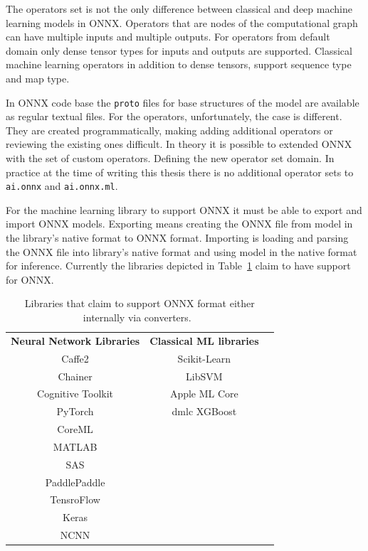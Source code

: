 \documentclass[english, 12pt, a4paper, elec, utf8, online]{aaltothesis}
\begin{document}
The operators set is not the only difference between classical and deep machine learning models in ONNX.  Operators that are nodes of the computational graph can have multiple inputs and multiple outputs. For operators from default domain only dense tensor types for inputs and outputs are supported. Classical machine learning operators in addition to dense tensors, support sequence type and map type. 

In ONNX code base the \texttt{proto} files for base structures of the model are available as regular textual files. For the operators, unfortunately, the case is different. They are created programmatically, making adding additional operators or reviewing the existing ones difficult. In theory it is possible to extended ONNX with the set of custom operators. Defining the new operator set domain. In practice at the time of writing this thesis there is no additional operator sets to \texttt{ai.onnx} and \texttt{ai.onnx.ml}.

For the machine learning library to support ONNX it must be able to export and import ONNX models. Exporting means creating the ONNX file from model in the library's native format to ONNX format. Importing is loading and parsing the ONNX file into library's native format and using model in the native format for inference. Currently the libraries depicted in Table~\ref{tab:onnx_libraries} claim to have support for ONNX.

\begin{table}[h!]
\begin{center}
\caption{Libraries that claim to support ONNX format either internally via converters.~\cite{onnx_tools}} \label{tab:onnx_libraries}
\begin{tabular}{ c c c }
 \textbf{Neural Network Libraries} & \textbf{Classical ML libraries} \\	
 Caffe2            & Scikit-Learn  \\ 
 Chainer           & LibSVM  \\  
 Cognitive Toolkit & Apple ML Core \\    
 PyTorch           & dmlc XGBoost \\
 CoreML            \\
 MATLAB            \\
 SAS               \\
 PaddlePaddle      \\ 
 TensroFlow        \\
 Keras             \\
 NCNN              \\
\end{tabular}
\end{center}
\end{table}
\end{document}
